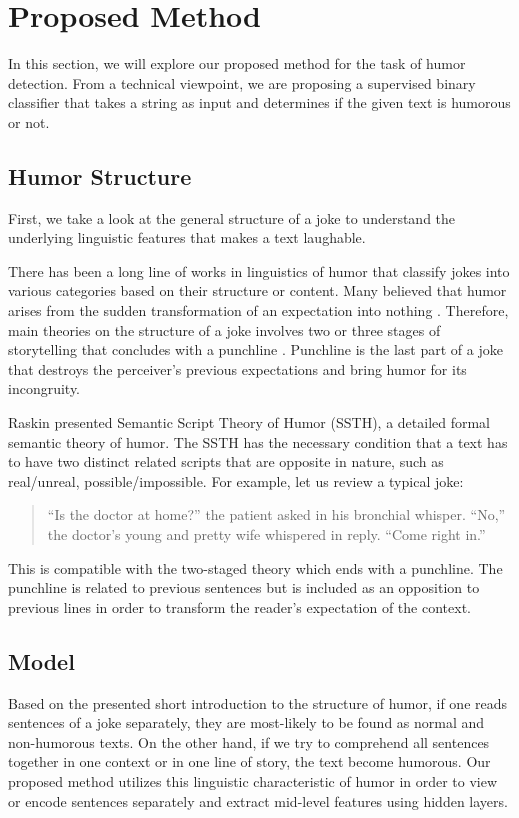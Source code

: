 \documentclass[journal]{IEEEtran}
\begin{document}
\section{Proposed Method}
In this section, we will explore our proposed method for the task of humor detection. From a technical viewpoint, we are proposing a supervised binary classifier that takes a string as input and determines if the given text is humorous or not.

\subsection{Humor Structure}
First, we take a look at the general structure of a joke to understand the underlying linguistic features that makes a text laughable. 

There has been a long line of works in linguistics of humor that classify jokes into various categories based on their structure or content. Many believed that humor arises from the sudden transformation of an expectation into nothing \cite{kant1913kritik}. Therefore, main theories on the structure of a joke involves two or three stages of storytelling that concludes with a punchline \cite{eysenck1942appreciation, suls1972two}. Punchline is the last part of a joke that destroys the perceiver's previous expectations and bring humor for its incongruity.

Raskin \cite{raskin2012semantic} presented Semantic Script Theory of Humor (SSTH), a detailed formal semantic theory of humor. The SSTH has the necessary condition that a text has to have two distinct related scripts that are opposite in nature, such as real/unreal, possible/impossible. For example, let us review a typical joke:
    \begin{quote}
        “Is the doctor at home?” the patient asked in his bronchial whisper. “No,” the doctor’s young and pretty wife whispered in reply. “Come right in.” \cite{raskin2012semantic}
    \end{quote}
This is compatible with the two-staged theory which ends with a punchline. The punchline is related to previous sentences but is included as an opposition to previous lines in order to transform the reader's expectation of the context.

\subsection{Model}
Based on the presented short introduction to the structure of humor, if one reads sentences of a joke separately, they are most-likely to be found as normal and non-humorous texts. On the other hand, if we try to comprehend all sentences together in one context or in one line of story, the text become humorous. Our proposed method utilizes this linguistic characteristic of humor in order to view or encode sentences separately and extract mid-level features using hidden layers.
\end{document}
